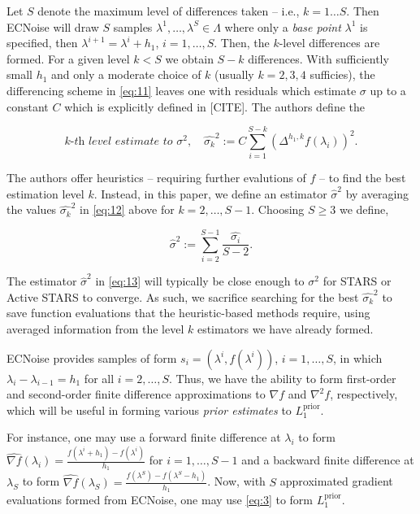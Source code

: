 \documentclass{amsart}
\begin{document}
\noindent Let $S$ denote the maximum level of differences taken -- i.e., $k=1\ldots S$. Then ECNoise will draw $S$ samples $\lambda^1,\ldots,\lambda^S \in \Lambda$ where only a \textit{base point} $\lambda^1$ is specified, then $\lambda^{i+1}=\lambda^{i}+h_1$, $i=1,\ldots,S$. Then, the $k$-level differences are formed. For a given level $k< S$ we obtain $S-k$ differences. With sufficiently small $h_1$ and only a moderate choice of $k$ (usually $k=2,3,4$ sufficies), the differencing scheme in \eqref{eq:11} leaves one with residuals which estimate $\sigma$ up to a constant $C$ which is explicitly defined in [CITE]. The authors define the



\begin{equation} \label{eq:12}
\textit{$k$-th level estimate to $\sigma^2,$}\quad \hat{\sigma_k}^2:=C\sum_{i=1}^{S-k}\left(\Delta^{h_1,k}f(\lambda_i)\right)^2.
\end{equation}  

The authors offer heuristics -- requiring further evalutions of $f$ -- to find the best estimation level $k$. Instead, in this paper, we define an estimator $\hat{\sigma}^2$ by averaging the values $\hat{\sigma_k}^2$ in \eqref{eq:12} above for $k=2,\ldots,S-1.$ Choosing $S\geq 3$ we define,

\begin{equation} \label{eq:13}
 \hat{\sigma}^2:=\sum_{i=2}^{S-1}\frac{\hat{\sigma_i}}{S-2}.
\end{equation}  

The estimator $\hat{\sigma}^2$ in \eqref{eq:13} will typically be close enough to $\sigma^2$ for STARS or Active STARS to converge. As such, we sacrifice searching for the best $\hat{\sigma_k}^2$ to save function evaluations that the heuristic-based methods require, using averaged information from the level $k$ estimators we have already formed.

ECNoise provides samples of form $s_i=(\lambda^i, f(\lambda^i))$, $i=1,\ldots, S$, in which $\lambda_i-\lambda_{i-1}=h_1$ for all $i=2,\ldots, S.$ Thus, we have the ability to form first-order and second-order finite difference approximations to $\nabla f$ and $\nabla^2 f$, respectively, which will be useful in forming various \textit{prior estimates} to $L_1^\text{prior}$. 

For instance, one may use a forward finite difference at $\lambda_i$ to form $\hat{\nabla f}(\lambda_i)=\frac{f(\lambda^{i}+h_1)-f(\lambda^{i})}{h_1}$ for $i=1,\ldots,S-1$ and a backward finite difference at $\lambda_S$ to form $\hat{\nabla f}(\lambda_S)=\frac{f(\lambda^{S})-f(\lambda^{S}-h_1)}{h_1}$. Now, with $S$ approximated gradient evaluations formed from ECNoise, one may use \eqref{eq:3} to form $L_1^\text{prior}$.
\end{document}
